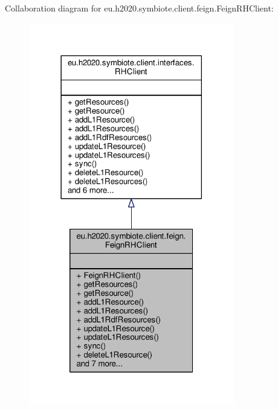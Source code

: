 Collaboration diagram for eu.\+h2020.\+symbiote.\+client.\+feign.\+Feign\+R\+H\+Client\+:\nopagebreak
\begin{figure}[H]
\begin{center}
\leavevmode
\includegraphics[width=254pt]{classeu_1_1h2020_1_1symbiote_1_1client_1_1feign_1_1FeignRHClient__coll__graph}
\end{center}
\end{figure}
